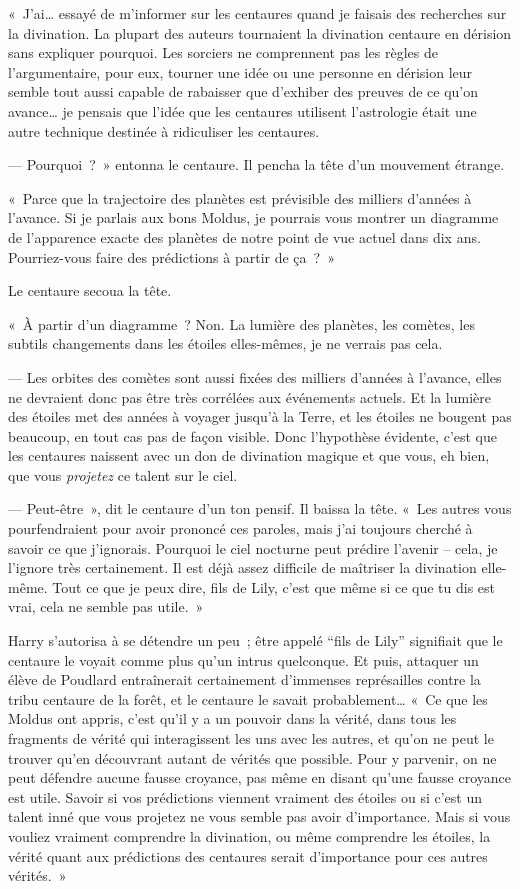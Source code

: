 «~J'ai… essayé de m'informer sur les centaures quand je faisais des recherches sur la divination.
La plupart des auteurs tournaient la divination centaure en dérision sans expliquer pourquoi.
Les sorciers ne comprennent pas les règles de l'argumentaire, pour eux, tourner une idée ou une personne en dérision leur semble tout aussi capable de rabaisser que d'exhiber des preuves de ce qu'on avance… je pensais que l'idée que les centaures utilisent l'astrologie était une autre technique destinée à ridiculiser les centaures.

--- Pourquoi~?~»
entonna le centaure.
Il pencha la tête d'un mouvement étrange.

«~Parce que la trajectoire des planètes est prévisible des milliers d'années à l'avance.
Si je parlais aux bons Moldus, je pourrais vous montrer un diagramme de l'apparence exacte des planètes de notre point de vue actuel dans dix ans.
Pourriez-vous faire des prédictions à partir de ça~?~»

Le centaure secoua la tête.

«~À partir d'un diagramme~?
Non. La lumière des planètes, les comètes, les subtils changements dans les étoiles elles-mêmes, je ne verrais pas cela.

--- Les orbites des comètes sont aussi fixées des milliers d'années à l'avance, elles ne devraient donc pas être très corrélées aux événements actuels.
Et la lumière des étoiles met des années à voyager jusqu'à la Terre, et les étoiles ne bougent pas beaucoup, en tout cas pas de façon visible.
Donc l'hypothèse évidente, c'est que les centaures naissent avec un don de divination magique et que vous, eh bien, que vous \emph{projetez} ce talent sur le ciel.

--- Peut-être~», dit le centaure d'un ton pensif.
Il baissa la tête.
«~Les autres vous pourfendraient pour avoir prononcé ces paroles, mais j'ai toujours cherché à savoir ce que j'ignorais.
Pourquoi le ciel nocturne peut prédire l'avenir -- cela, je l'ignore très certainement.
Il est déjà assez difficile de maîtriser la divination elle-même.
Tout ce que je peux dire, fils de Lily, c'est que même si ce que tu dis est vrai, cela ne semble pas utile.~»

Harry s'autorisa à se détendre un peu~; être appelé “fils de Lily” signifiait que le centaure le voyait comme plus qu'un intrus quelconque.
Et puis, attaquer un élève de Poudlard entraînerait certainement d'immenses représailles contre la tribu centaure de la forêt, et le centaure le savait probablement…
«~Ce que les Moldus ont appris, c'est qu'il y a un pouvoir dans la vérité, dans tous les fragments de vérité qui interagissent les uns avec les autres, et qu'on ne peut le trouver qu'en découvrant autant de vérités que possible.
Pour y parvenir, on ne peut défendre aucune fausse croyance, pas même en disant qu'une fausse croyance est utile.
Savoir si vos prédictions viennent vraiment des étoiles ou si c'est un talent inné que vous projetez ne vous semble pas avoir d'importance.
Mais si vous vouliez vraiment comprendre la divination, ou même comprendre les étoiles, la vérité quant aux prédictions des centaures serait d'importance pour ces autres vérités.~»

